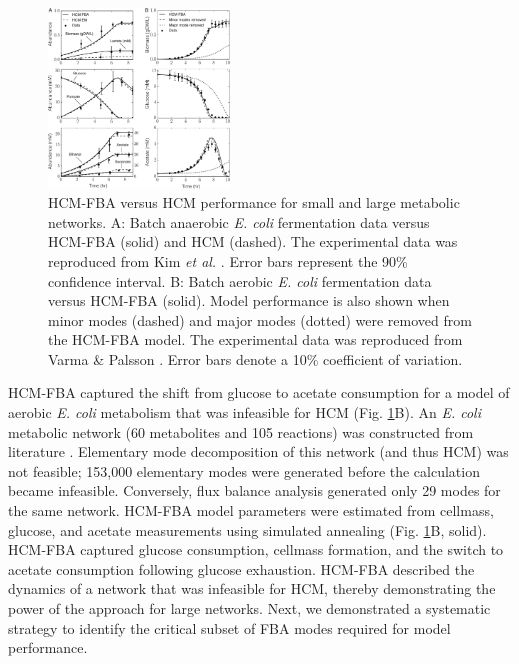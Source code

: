 \documentclass[10pt,twocolumn,twoside,final]{IEEEtran}
\begin{document}
\begin{figure}[!t]\centering
\includegraphics[width=0.43\textwidth]{./figs/Fig-2-Ecoli-SimulationResults.pdf}
\caption{HCM-FBA versus HCM performance for small and large metabolic networks.
A: Batch anaerobic \textit{E. coli} fermentation data versus HCM-FBA (solid) and HCM (dashed).
The experimental data was reproduced from Kim \textit{et al.} \cite{2008_kim_varner_ramkrishna_BiotechProg}. Error bars represent the 90\% confidence interval.
B: Batch aerobic \textit{E. coli} fermentation data versus HCM-FBA (solid).
Model performance is also shown when minor modes (dashed) and major modes (dotted) were removed from the HCM-FBA model.
The experimental data was reproduced from Varma \& Palsson \cite{1994_varma_palsson_ApplEnvMicro}. Error bars denote a 10\% coefficient of variation.}
\label{fig:ecoli}
\end{figure}

HCM-FBA captured the shift from glucose to acetate consumption for a model of aerobic \textit{E. coli} metabolism that was infeasible for HCM (Fig. \ref{fig:ecoli}B).
An \emph{E. coli} metabolic network (60 metabolites and 105 reactions) was constructed from literature \cite{2007_schuetz_etal_MolSysBio,2006_Palsson_model}.
Elementary mode decomposition of this network (and thus HCM) was not feasible; 153,000 elementary modes were generated before the calculation became infeasible.
Conversely, flux balance analysis generated only 29 modes for the same network.
HCM-FBA model parameters were estimated from cellmass, glucose, and acetate measurements \cite{1994_varma_palsson_ApplEnvMicro} using simulated annealing (Fig. \ref{fig:ecoli}B, solid).
HCM-FBA captured glucose consumption, cellmass formation, and the switch to acetate consumption following glucose exhaustion.
HCM-FBA described the dynamics of a network that was infeasible for HCM, thereby demonstrating the power of the approach for large networks.
Next, we demonstrated a systematic strategy to identify the critical subset of FBA modes required for model performance.
\end{document}
